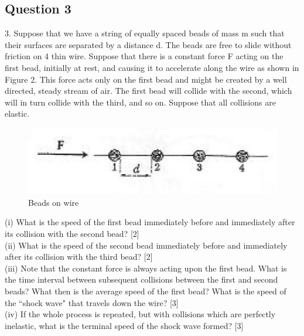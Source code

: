 \documentclass{article}
\begin{document}
\subsection{Question 3}
3. Suppose that we have a string of equally spaced beads of mass m such that their
surfaces are separated by a distance d. The beads are free to slide without friction
on 4 thin wire. Suppose that there is a constant force F acting on the first bead,
initially at rest, and causing it to accelerate along the wire as shown in Figure 2.
This force acts only on the first bead and might be created by a well directed, steady
stream of air. The first bead will collide with the second, which will in turn collide
with the third, and so on. Suppose that all collisions are elastic.

\begin{figure}
	\centering
	\includegraphics[width=0.7\linewidth]{spho_book_TYS_images/2011q3.png}
	\caption{Beads on wire}
\end{figure}

(i) What is the speed of the first bead immediately before and immediately after its collision with the second bead? [2] \\
(ii) What is the speed of the second bead immediately before and immediately after its collision with the third bead? [2] \\
(iii) Note that the constant force is always acting upon the first bead. What is the time interval between subsequent collisions between the first and second beads? What then is the average speed of the first bead? What is the speed of the “shock wave" that travels down the wire? [3] \\
(iv) If the whole process is repeated, but with collisions which are perfectly inelastic, what is the terminal speed of the shock wave formed? [3] \\
\end{document}
